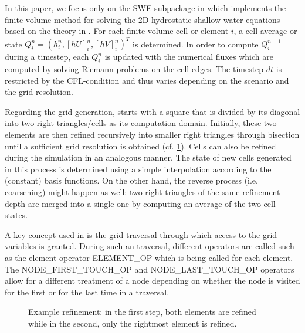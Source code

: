 In this paper, we focus only on the SWE subpackage in \samoa which implements the finite volume method for solving the 2D-hydrostatic shallow water equations based on the theory in \cite{leveque}. For each finite volume cell or element $i$, a cell average or state $Q_i^{n}= (h_i^{n},[hU]_i^{n},[hV]_i^{n})^T$ is determined. In order to compute $Q_i^{n+1}$ during a timestep, each $Q_i^{n}$ is updated with the numerical fluxes which are computed by solving Riemann problems on the cell edges. The timestep $dt$ is restricted by the CFL-condition and thus varies depending on the scenario and the grid resolution.  

Regarding the grid generation, \samoa starts with a square that is divided by its diagonal into two right triangles/cells as its computation domain. Initially, these two elements are then refined recursively into smaller right triangles through bisection until a sufficient grid resolution is obtained (cf. \ref{fig:adapt_grid}). Cells can also be refined during the simulation in an analogous manner. The state of new cells generated in this process is determined using a simple interpolation according to the (constant) basis functions. On the other hand, the reverse process (i.e. coarsening) might happen as well: two right triangles of the same refinement depth are merged into a single one by computing an average of the two cell states.

A key concept used in \samoa is the grid traversal through which access to the grid variables is granted. During such an traversal, different operators are called such as the element operator ELEMENT\_OP which is being called for each element. The NODE\_FIRST\_TOUCH\_OP and NODE\_LAST\_TOUCH\_OP operators allow for a different treatment of a node depending on whether the node is visited for the first or for the last time in a traversal.

\begin{figure}
\centering
{}
\caption{Example refinement: in the first step, both elements are refined while in the second, only the rightmost element is refined.}
\label{fig:adapt_grid}
\end{figure}

